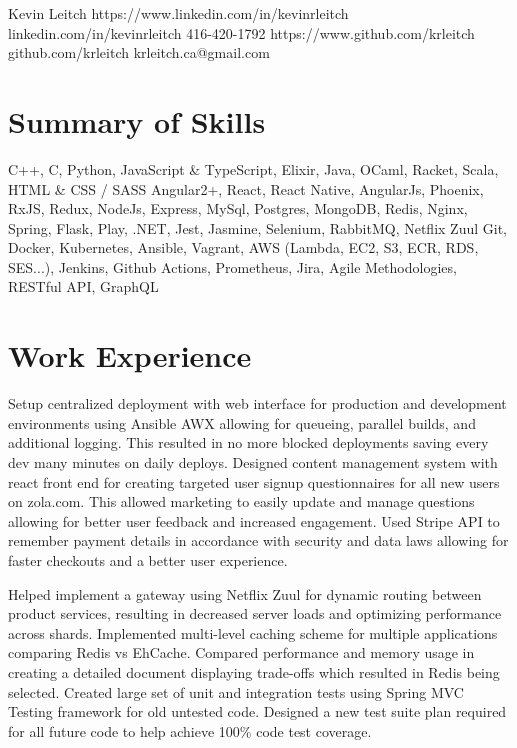 \documentclass{my_resume}
\begin{document}

\myhead
{Kevin Leitch}
{https://www.linkedin.com/in/kevinrleitch}
{linkedin.com/in/kevinrleitch}
{416-420-1792}
{https://www.github.com/krleitch}
{github.com/krleitch}
{krleitch.ca@gmail.com}

\section{Summary of Skills}
{C++, C, Python, JavaScript \& TypeScript, Elixir, Java, OCaml, Racket, Scala, HTML \& CSS / SASS}
{Angular2+, React, React Native, AngularJs, Phoenix, RxJS, Redux, NodeJs, Express, MySql, Postgres,
 MongoDB, Redis, Nginx, Spring, Flask, Play, .NET, Jest, Jasmine, Selenium, RabbitMQ, Netflix Zuul}
{Git, Docker, Kubernetes, Ansible, Vagrant, AWS (Lambda, EC2, S3, ECR, RDS, SES...),
 Jenkins, Github Actions, Prometheus, Jira, Agile Methodologies, RESTful API, GraphQL}

\section{Work Experience}

\workitemsthree
{Setup centralized deployment with web interface for production and development environments using Ansible AWX allowing for queueing, parallel builds, and additional logging. This resulted in no more blocked deployments saving every dev many minutes on daily deploys.}
{Designed content management system with react front end for creating targeted user signup questionnaires for all new users on zola.com. This allowed marketing to easily update and manage questions allowing for better user feedback and increased engagement.}
{Used Stripe API to remember payment details in accordance with security and data laws allowing for faster checkouts and a better user experience.}

\workitemsthree
{Helped implement a gateway using Netflix Zuul for dynamic routing between product services,
 resulting in decreased server loads and optimizing performance across shards.}
{Implemented multi-level caching scheme for multiple applications comparing Redis vs EhCache. Compared performance and memory usage in creating a detailed document displaying trade-offs which resulted in Redis being selected.}
{Created large set of unit and integration tests using Spring MVC Testing framework for old untested code.
 Designed a new test suite plan required for all future code to help achieve 100\% code test coverage.}
\end{document}
